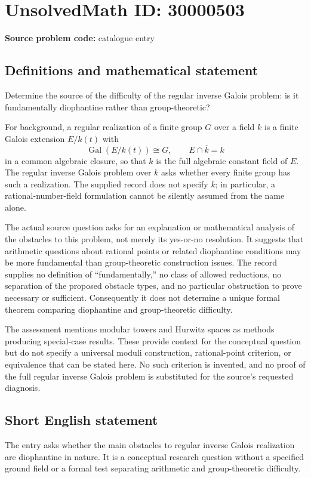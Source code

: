 \documentclass[11pt]{article}
\begin{document}
\section*{UnsolvedMath ID: 30000503}
\textbf{Source problem code:} catalogue entry
\subsection{Definitions and mathematical statement}
Determine the source of the difficulty of the regular inverse Galois problem: is it fundamentally diophantine rather than group-theoretic?

For background, a regular realization of a finite group $G$ over a field $k$ is a finite Galois extension $E/k(t)$ with
\[
 \operatorname{Gal}(E/k(t))\cong G,
 \qquad E\cap\overline{k}=k
\]
in a common algebraic closure, so that $k$ is the full algebraic constant field of $E$. The regular inverse Galois problem over $k$ asks whether every finite group has such a realization. The supplied record does not specify $k$; in particular, a rational-number-field formulation cannot be silently assumed from the name alone.

The actual source question asks for an explanation or mathematical analysis of the obstacles to this problem, not merely its yes-or-no resolution. It suggests that arithmetic questions about rational points or related diophantine conditions may be more fundamental than group-theoretic construction issues. The record supplies no definition of ``fundamentally,'' no class of allowed reductions, no separation of the proposed obstacle types, and no particular obstruction to prove necessary or sufficient. Consequently it does not determine a unique formal theorem comparing diophantine and group-theoretic difficulty.

The assessment mentions modular towers and Hurwitz spaces as methods producing special-case results. These provide context for the conceptual question but do not specify a universal moduli construction, rational-point criterion, or equivalence that can be stated here. No such criterion is invented, and no proof of the full regular inverse Galois problem is substituted for the source's requested diagnosis.
\subsection{Short English statement}
The entry asks whether the main obstacles to regular inverse Galois realization are diophantine in nature. It is a conceptual research question without a specified ground field or a formal test separating arithmetic and group-theoretic difficulty.
\end{document}
